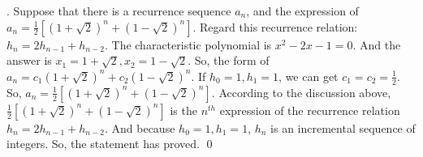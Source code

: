 \documentclass[12pt]{article}
\newenvironment{sol}
  {\par\vspace{3mm}\noindent{\it Solution}.}
  {\qed}
\begin{document}
\begin{sol}
    Suppose that there is a recurrence sequence $a_n$, and the expression of $a_n=\frac{1}{2}[(1+\sqrt{2})^n+(1-\sqrt{2})^n]$. Regard this recurrence relation: $h_n=2h_{n-1}+h_{n-2}$. The characteristic polynomial is $x^2-2x-1=0$.
    And the answer is $x_1=1+\sqrt{2}, x_2=1-\sqrt{2}  $. So, the form of $a_n=c_1(1+\sqrt{2} )^n+c_2(1-\sqrt{2} )^n$. If $h_0=1,h_1=1$, we can get $c_1=c_2=\frac{1}{2} $. So, $a_n=\frac{1}{2}[(1+\sqrt{2})^n+(1-\sqrt{2})^n]$.
    According to the discussion above, $\frac{1}{2}[(1+\sqrt{2})^n+(1-\sqrt{2})^n]$ is the $n^{th}$ expression of the recurrence relation $h_n=2h_{n-1}+h_{n-2}$. And because $h_0=1,h_1=1$, $h_n$ is an incremental sequence of integers.
    So, the statement has proved.
\end{sol}
\end{document}
